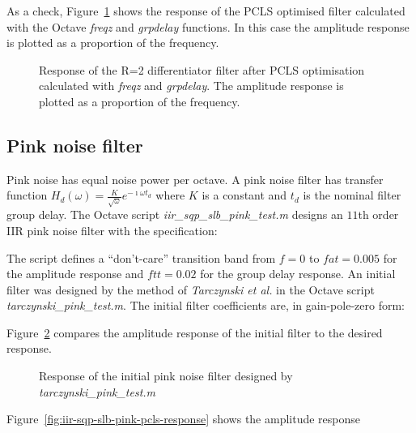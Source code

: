 \documentclass[a4paper,twoside,10pt,english]{report}
\begin{document}
As a check, Figure~\ref{fig:iir-sqp-slb-differentiator-pcls-freqz} shows the
response of the PCLS optimised filter calculated with the Octave \emph{freqz}
and \emph{grpdelay} functions. In this case the amplitude response is plotted
as a proportion of the frequency.
\begin{figure}[!htbp]
\begin{center}
\scalebox{0.7}{}
\caption{Response of the R=2 differentiator filter after PCLS optimisation
calculated with \emph{freqz} and \emph{grpdelay}. The amplitude response is
plotted as a proportion of the frequency.}
\label{fig:iir-sqp-slb-differentiator-pcls-freqz}
\end{center}
\end{figure}
\clearpage
\subsection{Pink noise filter}
Pink noise has equal noise power per octave. A pink noise filter has transfer
function
$H_{d}\left(\omega\right)=\frac{K}{\sqrt{\omega}}e ^{-\imath\omega t_{d}}$ where
$K$ is a constant and $t_{d}$ is the nominal filter group delay. The Octave
script \emph{iir\_sqp\_slb\_pink\_test.m} designs an $11$th order IIR pink 
noise filter with the specification:
\begin{small}

\end{small}
The script defines a ``don't-care'' transition band from $f=0$ to $fat=0.005$
for the amplitude response and $ftt=0.02$ for the group delay response.
An initial filter was designed by the method of \emph{Tarczynski et al.} in
the Octave script \emph{tarczynski\_pink\_test.m}. The initial filter 
coefficients are, in gain-pole-zero form:
\begin{small}

\end{small}
Figure~\ref{fig:iir-sqp-slb-pink-initial-response} compares the amplitude 
response of the initial filter to the desired response.
\begin{figure}[!htbp]
\begin{center}
\scalebox{0.7}{}
\caption{Response of the initial pink noise filter designed by 
\emph{tarczynski\_pink\_test.m}}
\label{fig:iir-sqp-slb-pink-initial-response}
\end{center}
\end{figure}
Figure~\ref{fig:iir-sqp-slb-pink-pcls-response} shows the amplitude response
\end{document}

